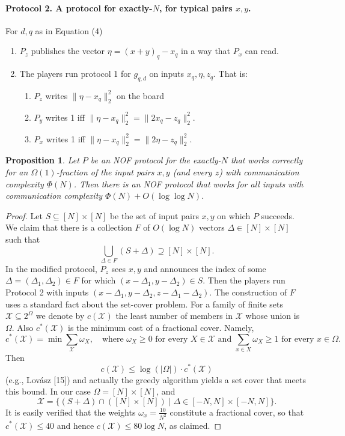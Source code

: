 \documentclass[10pt,a4paper]{article}
\newtheorem{proposition}[theorem]{Proposition}
\newcommand{\norm}[1]{\lVert#1\rVert}
\begin{document}
\paragraph{Protocol 2. A protocol for exactly-$N$, for typical pairs $x,y$.}
For $d,q$ as in Equation (4)
\begin{enumerate}
\item $P_z$ publishes the vector $\eta=(x+y)_q-x_q$ in a way that $P_x$ can read.
\item The players run protocol 1 for $g_{q,d}$ on inputs $x_q,\eta,z_q$. That is:
\begin{enumerate}
\item $P_z$ writes $\norm{\eta-x_q}_2^2$ on the board
\item $P_y$ writes 1 iff $\norm{\eta-x_q}_2^2=\norm{2x_q-z_q}_2^2$.
\item $P_x$ writes 1 iff $\norm{\eta-x_q}_2^2=\norm{2\eta-z_q}_2^2$.
\end{enumerate}
\end{enumerate}
\begin{proposition}
Let $P$ be an NOF protocol for the exactly-$N$ that works correctly for an $\Omega(1)$-fraction of the input pairs $x,y$ (and every $z$) with communication complexity $\Phi(N)$. Then there is an NOF protocol that works for all inputs with communication complexity $\Phi(N)+O(\log\log N)$.
\end{proposition}
\begin{proof}
Let $S\subseteq[N]\times[N]$ be the set of input pairs $x,y$ on which $P$ succeeds. We claim that there is a collection $F$ of $O(\log N)$ vectors $\Delta\in[N]\times[N]$ such that
\[\bigcup_{\Delta\in F}(S+\Delta)\supseteq[N]\times[N].\]
In the modified protocol, $P_z$ sees $x,y$ and announces the index of some $\Delta=(\Delta_1,\Delta_2)\in F$ for which $(x-\Delta_1,y-\Delta_2)\in S$. Then the players run Protocol 2 with inputs $(x-\Delta_1,y-\Delta_2,z-\Delta_1-\Delta_2)$.
The construction of $F$ uses a standard fact about the set-cover problem. For a family of finite sets $\mathcal X\subseteq2^\Omega$ we denote by $c(\mathcal X)$ the least number of members in $\mathcal X$ whose union is $\Omega$. Also $c^*(\mathcal X)$ is the minimum cost of a fractional cover. Namely,
\[c^*(\mathcal X)=\min\sum_{\mathcal X}\omega_X,\quad\text{where }\omega_X\ge0\text{ for every }X\in\mathcal X\text{ and }\sum_{x\in X}\omega_X\ge1\text{ for every }x\in\Omega.\]
Then
\[c(\mathcal X)\le\log(|\Omega|)\cdot c^*(\mathcal X)\]
(e.g., Lov\'asz [15]) and actually the greedy algorithm yields a set cover that meets this bound.
In our case $\Omega=[N]\times[N]$, and
\[\mathcal X=\{(S+\Delta)\cap([N]\times[N])\mid\Delta\in[-N,N]\times[-N,N]\}.\]
It is easily verified that the weights $\omega_x=\frac{10}{N^2}$ constitute a fractional cover, so that $c^*(\mathcal X)\le40$ and hence $c(\mathcal X)\le80\log N$, as claimed.
\end{proof}
\end{document}

